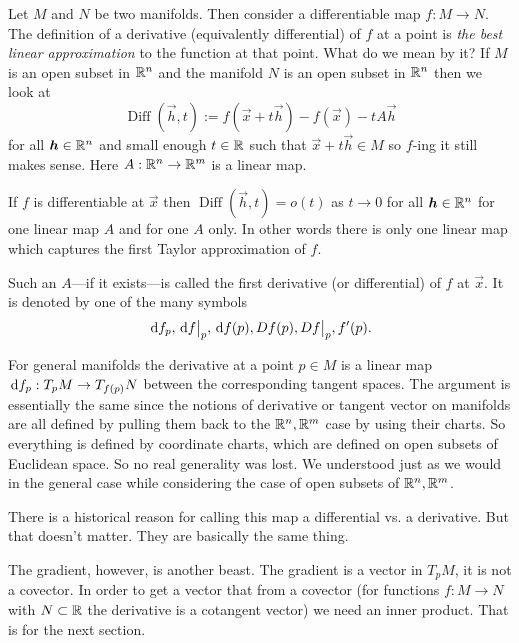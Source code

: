 \documentclass[12pt]{amsart}
\begin{document}
Let $M$ and $N$ be two manifolds. Then consider a differentiable map $f: M\to N$. The definition of a derivative (equivalently differential) of $f$ at a point is \emph{the best linear approximation} to the function at that point. What do we mean by it? If $M$ is an open subset in $\mathbb{R}^n$ and the manifold $N$ is an open subset in $\mathbb{R}^n$ then we look at
\begin{equation}\label{eq:derivativeDifference}
	\operatorname{Diff}(\vec{h},t) := f(\vec{x} + t \vec{h}) - f(\vec{x}) - tA\vec{h}
\end{equation}
for all $\mathbf{\boldsymbol{h}}\in \mathbb{R}^n$ and small enough $t\in \mathbb{R}$ such that $\vec{x} + t\vec{h}\in M$ so $f$-ing it still makes sense. Here  $A: \mathbb{R}^n \to \mathbb{R}^m$ is a linear map.

If $f$ is differentiable at $\vec{x}$  then $\operatorname{Diff}(\vec{h},t) = o(t)$ as $t\to 0$ for all $\mathbf{\boldsymbol{h}} \in \mathbb{R}^n$ for one linear map $A$ and for one $A$ only. In other words there is only one linear map which captures the first Taylor approximation of $f$. 

Such an $A$---if it exists---is called the first derivative (or differential) of $f$ at $\vec{x}$. It is denoted by one of the many symbols
\[
	\,\mathrm{d} f_p, \,\mathrm{d} f\big|_p, \,\mathrm{d} f(p), Df(p), Df\big|_p,  f'(p) .
\]

For general manifolds the derivative at a point $p \in M$ is a linear map $\,\mathrm{d} f_p : T_p M \to T_{f(p)} N$ between the corresponding tangent spaces. The argument is essentially the same since the notions of derivative or tangent vector on manifolds are all defined by pulling them back to the $\mathbb{R}^n, \mathbb{R}^m$ case by using their charts. So everything is defined by coordinate charts, which are defined on open subsets of Euclidean space. So no real generality was lost. We understood just as we would in the general case while considering the case of open subsets of  $\mathbb{R}^n, \mathbb{R}^m$. 

There is a historical reason for calling  this map a differential vs. a derivative. But that doesn't matter. They are basically the same thing. 

The gradient, however, is another beast. The gradient is a vector in $T_pM$, it is not a covector. In order to get a vector that from a covector (for functions $f: M\to N$ with $N \subset \mathbb{R}$ the derivative is a cotangent vector) we need an inner product. That is for the next section.
\end{document}
